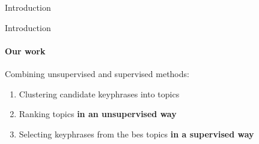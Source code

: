 \begin{frame}{Introduction}
\begin{figure}
    \end{figure}
  \end{frame}

  \begin{frame}{Introduction}
    \framesubtitle{Our work}

    Combining unsupervised and supervised methods:
    \begin{enumerate}
      \item{Clustering candidate keyphrases into topics}
      \item{Ranking topics \textbf{in an unsupervised way}}
      \item{Selecting keyphrases from the bes topics \textbf{in a supervised
            way}}
    \end{enumerate}
  \end{frame}

